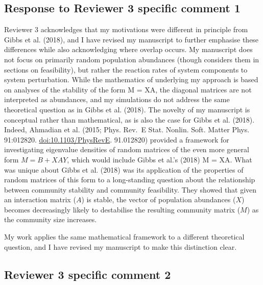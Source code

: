\documentclass[]{article}
\begin{document}
\subsection{Response to Reviewer 3 specific comment
1}\label{response-to-reviewer-3-specific-comment-1}

Reviewer 3 acknowledges that my motivations were different in principle
from Gibbs et al. (2018), and I have revised my manuscript to further
emphasise these differences while also acknowledging where overlap
occurs. My manuscript does not focus on primarily random population
abundances (though considers them in sections on feasibility), but
rather the reaction rates of system components to system perturbation.
While the mathematics of underlying my approach is based on analyses of
the stability of the form M = XA, the diagonal matrices are not
interpreted as abundances, and my simulations do not address the same
theoretical question as in Gibbs et al. (2018). The novelty of my
manuscript is conceptual rather than mathematical, as is also the case
for Gibbs et al. (2018). Indeed, Ahmadian et al. (2015; Phys. Rev.~E
Stat. Nonlin. Soft. Matter Phys. 91:012820. \url{doi:10.1103/PhysRevE}.
91.012820) provided a framework for investigating eigenvalue densities
of random matrices of the even more general form \(M = B + XAY\), which
would include Gibbs et al.'s (2018) M = XA. What was unique about Gibbs
et al. (2018) was its application of the properties of random matrices
of this form to a long-standing question about the relationship between
community stability and community feasibility. They showed that given an
interaction matrix (\(A\)) is stable, the vector of population
abundances (\(X\)) becomes decreasingly likely to destabilise the
resulting community matrix (\(M\)) as the community size increases.

My work applies the same mathematical framework to a different
theoretical question, and I have revised my manuscript to make this
distinction clear.

\subsection{Reviewer 3 specific comment
2}\label{reviewer-3-specific-comment-2}
\end{document}
